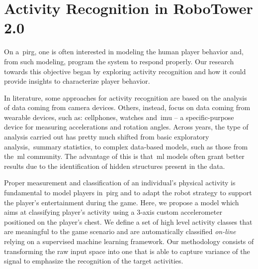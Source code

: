 \chapter{Activity Recognition in RoboTower 2.0}\label{ch:activity}
On a~\gls{pirg}, one is often interested in modeling the human player behavior and, from such modeling, program the system to respond properly. Our research towards this objective began by exploring activity recognition and how it could provide insights to characterize player behavior. 

In literature, some approaches for activity recognition are based on the analysis of data coming from camera devices. Others, instead, focus on data coming from wearable devices, such as: cellphones, watches and~\gls{imu} -- a specific-purpose device for measuring accelerations and rotation angles. Across years, the type of analysis carried out has pretty much shifted from basic exploratory analysis,~\eg summary statistics, %
to complex data-based models, such as those from the~\gls{ml} community. The advantage of this is that~\gls{ml} models often grant better results due to the identification of hidden structures present in the data.



Proper measurement and classification of an individual's physical  activity is fundamental to model players in~\gls{pirg} and to adapt the robot strategy to support the player's entertainment during the game. Here, we propose a model which aims at classifying player's activity using a 3-axis custom accelerometer positioned on the player's chest. We define a set of high level activity classes that are meaningful to the game scenario and are automatically classified \textit{on-line} relying on a supervised machine learning framework. Our methodology consists of transforming the raw input space into one that is able to capture variance of the signal to emphasize the recognition of the target activities. 

